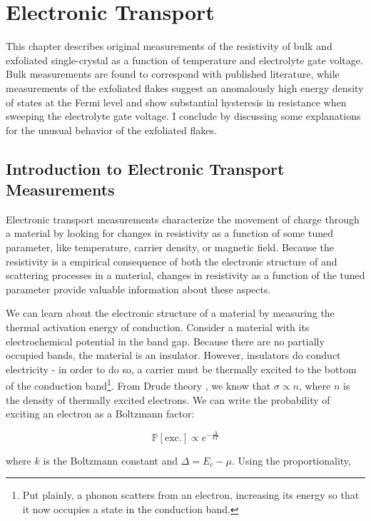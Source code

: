\chapter{Electronic Transport}
This chapter describes original measurements of the resistivity of bulk and exfoliated single-crystal \rucl as a function of temperature and electrolyte gate voltage. Bulk measurements are found to correspond with published literature, while measurements of the exfoliated flakes suggest an anomalously high energy density of states at the Fermi level and show substantial hysteresis in resistance when sweeping the electrolyte gate voltage. I conclude by discussing some explanations for the unusual behavior of the exfoliated flakes.

\section{Introduction to Electronic Transport Measurements}

Electronic transport measurements characterize the movement of charge through a material by looking for changes in resistivity as a function of some tuned parameter, like temperature, carrier density, or magnetic field. Because the resistivity is a empirical consequence of both the electronic structure of and scattering processes in a material, changes in resistivity as a function of the tuned parameter provide valuable information about these aspects.

We can learn about the electronic structure of a material by measuring the thermal activation energy of conduction. Consider a material with its electrochemical potential in the band gap. Because there are no partially occupied bands, the material is an insulator. However, insulators do conduct electricity - in order to do so, a carrier must be thermally excited to the bottom of the conduction band\footnote{Put plainly, a phonon scatters from an electron, increasing its energy so that it now occupies a state in the conduction band.}. From Drude theory \cite{Ashcroft1976}, we know that $\sigma \propto n$, where $n$ is the density of thermally excited electrons. We can write the probability of exciting an electron as a Boltzmann factor:

\begin{equation}
\mathbb{P}[\text{exc.}] \propto e^{-\frac{\Delta}{kT}}
\end{equation}

where $k$ is the Boltzmann constant and $\Delta = E_{c} - \mu$. Using the proportionality,

